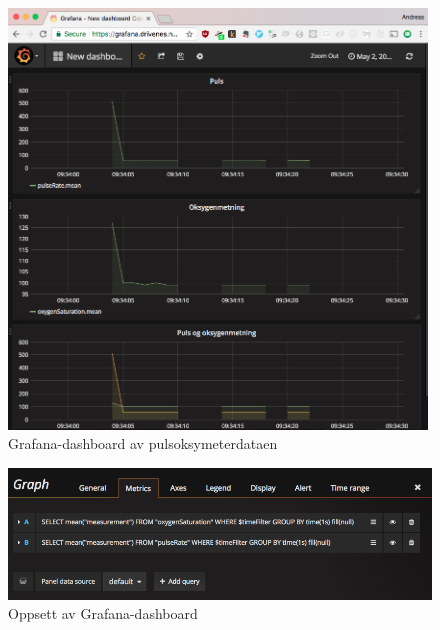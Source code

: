 \begin{figure}
\includegraphics[width=0.99\textwidth, center]{fig/grafana}
\caption{Grafana-dashboard av pulsoksymeterdataen}
\label{fig:grafana}
\end{figure}

\begin{figure}
\includegraphics[width=1.0\textwidth, center]{fig/grafana_setup}
\caption{Oppsett av Grafana-dashboard}
\label{fig:grafana_setup}
\end{figure}
